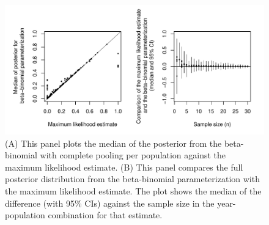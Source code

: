 \documentclass[12pt, oneside, titlepage]{article}   	%
\begin{document}




\clearpage

 \begin{figure}[h]
   \centering
       \includegraphics[page=1,width=.9\textwidth]{../figures/appendix-x-mle_bayes}  
    \caption{ (A) This panel plots the median of the posterior from the beta-binomial with complete pooling per population against the maximum likelihood estimate. (B) This panel compares the full posterior distribution from the beta-binomial parameterization with the maximum likelihood estimate. The plot shows the median of the difference (with 95\% CIs) against the sample size in the year-population combination for that estimate.  }
 \label{fig:mle_bayes}
\end{figure}
\end{document}
